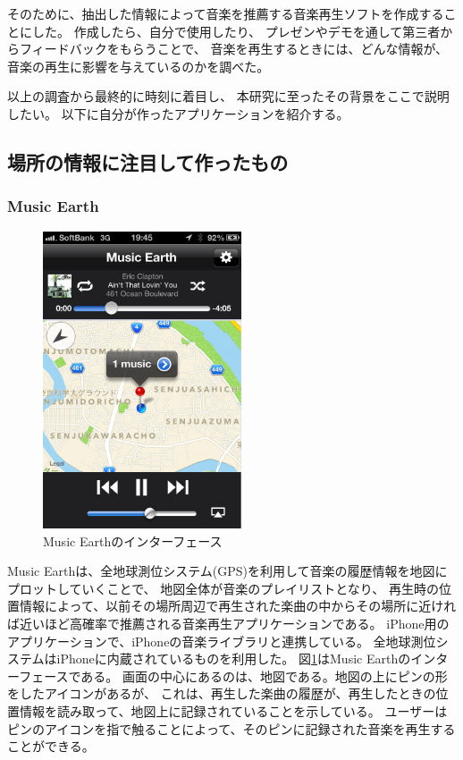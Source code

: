 \documentclass[11pt, onecolumn]{jsarticle}
\begin{document}
そのために、抽出した情報によって音楽を推薦する音楽再生ソフトを作成することにした。
作成したら、自分で使用したり、
プレゼンやデモを通して第三者からフィードバックをもらうことで、
音楽を再生するときには、どんな情報が、音楽の再生に影響を与えているのかを調べた。

以上の調査から最終的に時刻に着目し、
本研究に至ったその背景をここで説明したい。
以下に自分が作ったアプリケーションを紹介する。

\subsection{場所の情報に注目して作ったもの}


\subsubsection{Music Earth}

\begin{figure}[h]
\begin{center}
\includegraphics[width=5.866cm]{musicEarth.png}
\caption{Music Earthのインターフェース}
\label{musicEarth_interface}
\end{center}
\end{figure}
Music Earthは、全地球測位システム(GPS)を利用して音楽の履歴情報を地図にプロットしていくことで、
地図全体が音楽のプレイリストとなり、
再生時の位置情報によって、以前その場所周辺で再生された楽曲の中からその場所に近ければ近いほど高確率で推薦される音楽再生アプリケーションである。
iPhone用のアプリケーションで、iPhoneの音楽ライブラリと連携している。
全地球測位システムはiPhoneに内蔵されているものを利用した。
図\ref{musicEarth_interface}はMusic Earthのインターフェースである。
画面の中心にあるのは、地図である。地図の上にピンの形をしたアイコンがあるが、
これは、再生した楽曲の履歴が、再生したときの位置情報を読み取って、地図上に記録されていることを示している。
ユーザーはピンのアイコンを指で触ることによって、そのピンに記録された音楽を再生することができる。
\end{document}
